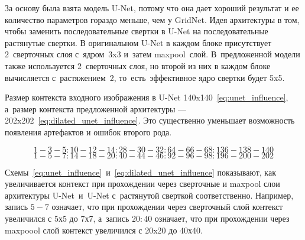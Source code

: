 За основу была взята модель U-Net, потому что она дает хороший результат и ее количество параметров гораздо меньше, чем у GridNet. Идея архитектуры в том, чтобы заменить последовательные свертки в U-Net на последовательные растянутые свертки. В оригинальном U-Net в каждом блоке присутствует 2~сверточных слоя с~ядром~3x3 и~затем maxpool~слой. В~предложенной модели также используется 2~сверточных слоя, но второй из них в каждом блоке вычисляется с~растяжением~2, то~есть~эффективное ядро свертки будет 5x5. 

\newpage

Размер контекста входного изображения в U-Net 140x140~\eqref{eq:unet_influence}, а~размер контекста предложенной архитектуры — 202x202~\eqref{eq:dilated_unet_influence}. Это существенно уменьшает возможность появления артефактов и ошибок второго рода.

\begin{equation} 
\label{eq:unet_influence}
1-3-5:10-12-14:28-30-32:64-66-68:136-138-140
\end{equation}
\begin{equation} 
\label{eq:dilated_unet_influence}
1-5-7:14-18-20:40-44-46:92-96-98:196-200-202
\end{equation}

Схемы~\eqref{eq:unet_influence}~и~\eqref{eq:dilated_unet_influence} показывают, как увеличивается контекст при прохождении через сверточные и maxpool слои архитектуры U-Net~и~U-Net с~растянутой сверткой соответственно. Например, запись $5-7$ означает, что при прохождении через сверточный слой контекст увеличился с 5х5 до 7х7, а~запись $20:40$ означает, что при прохождении через maxpoool слой контекст увеличился с 20x20 до 40х40.
